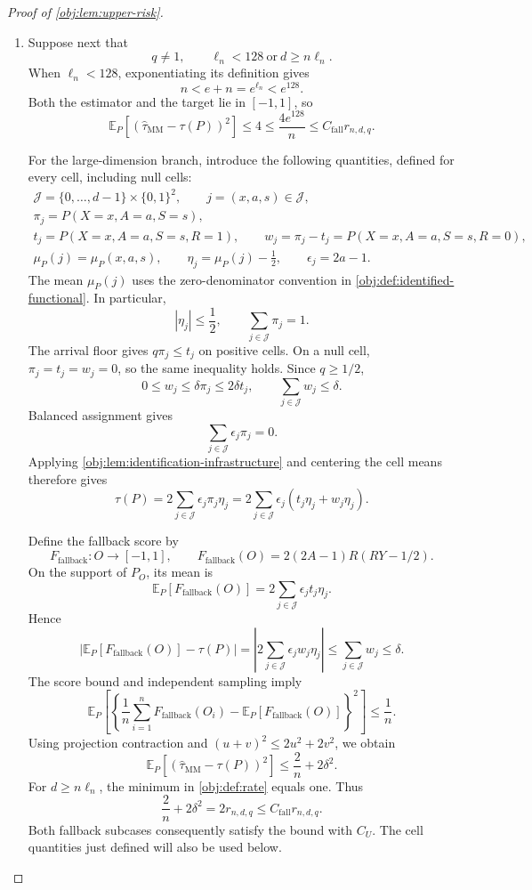 \documentclass[11pt]{article}
\begin{document}
\begin{proof}[Proof of \cref{obj:lem:upper-risk}]
\begin{enumerate}
\item Suppose next that
\[
q\ne1,
\qquad
\ell_n<128\ \text{or}\ d\ge n\ell_n.
\]
When \(\ell_n<128\), exponentiating its definition gives
\[
n<e+n=e^{\ell_n}<e^{128}.
\]
Both the estimator and the target lie in \([-1,1]\), so
\[
\mathbb E_P[(\widehat\tau_{\mathrm{MM}}-\tau(P))^2]
\le4
\le\frac{4e^{128}}n
\le C_{\mathrm{fall}}r_{n,d,q}.
\]

For the large-dimension branch, introduce the following quantities, defined for every cell, including null cells:
\[
\begin{gathered}
\mathcal J=\{0,\ldots,d-1\}\times\{0,1\}^2,
\qquad j=(x,a,s)\in\mathcal J,\\
\pi_j=P(X=x,A=a,S=s),\\
t_j=P(X=x,A=a,S=s,R=1),
\qquad
w_j=\pi_j-t_j=P(X=x,A=a,S=s,R=0),\\
\mu_P(j)=\mu_P(x,a,s),
\qquad
\eta_j=\mu_P(j)-\frac12,
\qquad
\epsilon_j=2a-1.
\end{gathered}
\]
The mean \(\mu_P(j)\) uses the zero-denominator convention in
\cref{obj:def:identified-functional}. In particular,
\[
|\eta_j|\le\frac12,\qquad
\sum_{j\in\mathcal J}\pi_j=1.
\]
The arrival floor gives \(q\pi_j\le t_j\) on positive cells. On a null cell,
\(\pi_j=t_j=w_j=0\), so the same inequality holds. Since \(q\ge1/2\),
\[
0\le w_j\le\delta\pi_j\le2\delta t_j,
\qquad
\sum_{j\in\mathcal J}w_j\le\delta.
\]
Balanced assignment gives
\[
\sum_{j\in\mathcal J}\epsilon_j\pi_j=0.
\]
Applying \cref{obj:lem:identification-infrastructure} and centering the cell means therefore gives
\[
\tau(P)
=2\sum_{j\in\mathcal J}\epsilon_j\pi_j\eta_j
=2\sum_{j\in\mathcal J}\epsilon_j(t_j\eta_j+w_j\eta_j).
\]

Define the fallback score by
\[
F_{\mathrm{fallback}}:O\longrightarrow[-1,1],
\qquad
F_{\mathrm{fallback}}(O)=2(2A-1)R(RY-1/2).
\]
On the support of \(P_O\), its mean is
\[
\mathbb E_P[F_{\mathrm{fallback}}(O)]
=2\sum_{j\in\mathcal J}\epsilon_jt_j\eta_j.
\]
Hence
\[
\left|\mathbb E_P[F_{\mathrm{fallback}}(O)]-\tau(P)\right|
=\left|2\sum_{j\in\mathcal J}\epsilon_jw_j\eta_j\right|
\le\sum_{j\in\mathcal J}w_j
\le\delta.
\]
The score bound and independent sampling imply
\[
\mathbb E_P\!\left[
\left\{\frac1n\sum_{i=1}^nF_{\mathrm{fallback}}(O_i)
-\mathbb E_P[F_{\mathrm{fallback}}(O)]\right\}^2
\right]\le\frac1n.
\]
Using projection contraction and
\((u+v)^2\le2u^2+2v^2\), we obtain
\[
\mathbb E_P[(\widehat\tau_{\mathrm{MM}}-\tau(P))^2]
\le\frac2n+2\delta^2.
\]
For \(d\ge n\ell_n\), the minimum in \cref{obj:def:rate} equals one. Thus
\[
\frac2n+2\delta^2
=2r_{n,d,q}
\le C_{\mathrm{fall}}r_{n,d,q}.
\]
Both fallback subcases consequently satisfy the bound with \(C_U\).
The cell quantities just defined will also be used below.


\end{enumerate}
\end{proof}
\end{document}
